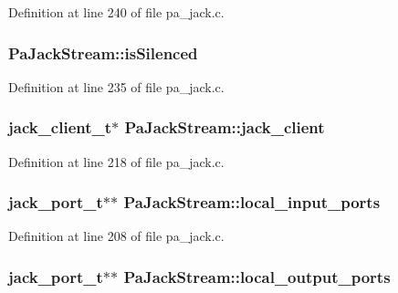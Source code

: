 Definition at line 240 of file pa\+\_\+jack.\+c.

\subsubsection[{\texorpdfstring{is\+Silenced}{isSilenced}}]{ Pa\+Jack\+Stream\+::is\+Silenced}\hypertarget{struct_pa_jack_stream_acc19c258acb8ac0f67451b3ac17482a9}{}\label{struct_pa_jack_stream_acc19c258acb8ac0f67451b3ac17482a9}


Definition at line 235 of file pa\+\_\+jack.\+c.

\subsubsection[{\texorpdfstring{jack\+\_\+client}{jack_client}}]{\setlength{\rightskip}{0pt plus 5cm}jack\+\_\+client\+\_\+t$\ast$ Pa\+Jack\+Stream\+::jack\+\_\+client}\hypertarget{struct_pa_jack_stream_ac86d61cec117a6ae3daf0005327120b8}{}\label{struct_pa_jack_stream_ac86d61cec117a6ae3daf0005327120b8}


Definition at line 218 of file pa\+\_\+jack.\+c.

\subsubsection[{\texorpdfstring{local\+\_\+input\+\_\+ports}{local_input_ports}}]{\setlength{\rightskip}{0pt plus 5cm}jack\+\_\+port\+\_\+t$\ast$$\ast$ Pa\+Jack\+Stream\+::local\+\_\+input\+\_\+ports}\hypertarget{struct_pa_jack_stream_ab3d29e0bdd8072b82e516d3251e36545}{}\label{struct_pa_jack_stream_ab3d29e0bdd8072b82e516d3251e36545}


Definition at line 208 of file pa\+\_\+jack.\+c.

\subsubsection[{\texorpdfstring{local\+\_\+output\+\_\+ports}{local_output_ports}}]{\setlength{\rightskip}{0pt plus 5cm}jack\+\_\+port\+\_\+t$\ast$$\ast$ Pa\+Jack\+Stream\+::local\+\_\+output\+\_\+ports}\hypertarget{struct_pa_jack_stream_aa50ae53f3cad8933accd2754780a812c}{}\label{struct_pa_jack_stream_aa50ae53f3cad8933accd2754780a812c}


